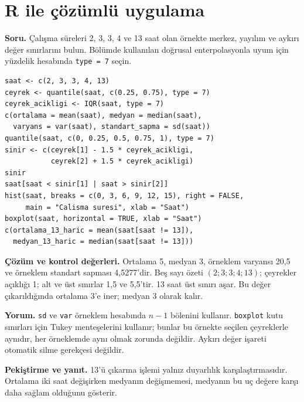 \section{R ile çözümlü uygulama}
\label{sec:r-b03}

\textbf{Soru.} Çalışma süreleri 2, 3, 3, 4 ve 13 saat olan örnekte merkez,
yayılım ve aykırı değer sınırlarını bulun. Bölümde kullanılan doğrusal
enterpolasyonla uyum için yüzdelik hesabında \texttt{type = 7} seçin.

\begin{lstlisting}[style=prismR]
saat <- c(2, 3, 3, 4, 13)
ceyrek <- quantile(saat, c(0.25, 0.75), type = 7)
ceyrek_acikligi <- IQR(saat, type = 7)
c(ortalama = mean(saat), medyan = median(saat),
  varyans = var(saat), standart_sapma = sd(saat))
quantile(saat, c(0, 0.25, 0.5, 0.75, 1), type = 7)
sinir <- c(ceyrek[1] - 1.5 * ceyrek_acikligi,
           ceyrek[2] + 1.5 * ceyrek_acikligi)
sinir
saat[saat < sinir[1] | saat > sinir[2]]
hist(saat, breaks = c(0, 3, 6, 9, 12, 15), right = FALSE,
     main = "Calisma suresi", xlab = "Saat")
boxplot(saat, horizontal = TRUE, xlab = "Saat")
c(ortalama_13_haric = mean(saat[saat != 13]),
  medyan_13_haric = median(saat[saat != 13]))
\end{lstlisting}

\begin{outputguidebox}
\textbf{Çözüm ve kontrol değerleri.} Ortalama 5, medyan 3, örneklem
varyansı 20,5 ve örneklem standart sapması 4,5277'dir. Beş sayı özeti
$(2;3;3;4;13)$; çeyrekler açıklığı 1; alt ve üst sınırlar 1,5 ve 5,5'tir.
13 saat üst sınırı aşar. Bu değer çıkarıldığında ortalama 3'e iner;
medyan 3 olarak kalır.
\end{outputguidebox}

\textbf{Yorum.} \texttt{sd} ve \texttt{var} örneklem hesabında $n-1$
bölenini kullanır. \texttt{boxplot} kutu sınırları için Tukey menteşelerini
kullanır; bunlar bu örnekte seçilen çeyreklerle aynıdır, her örneklemde aynı
olmak zorunda değildir. Aykırı değer işareti otomatik silme gerekçesi değildir.

\textbf{Pekiştirme ve yanıt.} 13'ü çıkarma işlemi yalnız duyarlılık
karşılaştırmasıdır. Ortalama iki saat değişirken medyanın değişmemesi,
medyanın bu uç değere karşı daha sağlam olduğunu gösterir.
